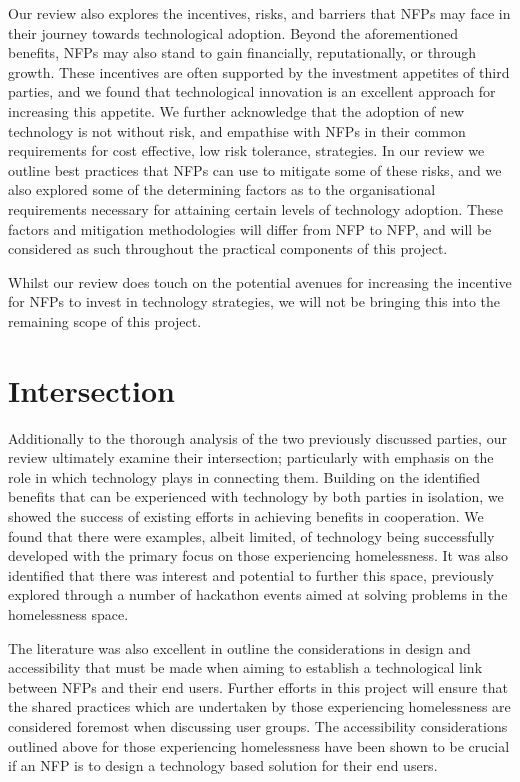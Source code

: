 Our review also explores the incentives, risks, and barriers that NFPs may face in their journey towards technological adoption. Beyond the aforementioned benefits, NFPs may also stand to gain financially, reputationally, or through growth. These incentives are often supported by the investment appetites of third parties, and we found that technological innovation is an excellent approach for increasing this appetite. We further acknowledge that the adoption of new technology is not without risk, and empathise with NFPs in their common requirements for cost effective, low risk tolerance, strategies. In our review we outline best practices that NFPs can use to mitigate some of these risks, and we also explored some of the determining factors as to the organisational requirements necessary for attaining certain levels of technology adoption. These factors and mitigation methodologies will differ from NFP to NFP, and will be considered as such throughout the practical components of this project.

Whilst our review does touch on the potential avenues for increasing the incentive for NFPs to invest in technology strategies, we will not be bringing this into the remaining scope of this project.

\section{Intersection}

Additionally to the thorough analysis of the two previously discussed parties, our review ultimately examine their intersection; particularly with emphasis on the role in which technology plays in connecting them. Building on the identified benefits that can be experienced with technology by both parties in isolation, we showed the success of existing efforts in achieving benefits in cooperation. We found that there were examples, albeit limited, of technology being successfully developed with the primary focus on those experiencing homelessness. It was also identified that there was interest and potential to further this space, previously explored through a number of hackathon events aimed at solving problems in the homelessness space.

The literature was also excellent in outline the considerations in design and accessibility that must be made when aiming to establish a technological link between NFPs and their end users. Further efforts in this project will ensure that the shared practices which are undertaken by those experiencing homelessness are considered foremost when discussing user groups. The accessibility considerations outlined above for those experiencing homelessness have been shown to be crucial if an NFP is to design a technology based solution for their end users.

